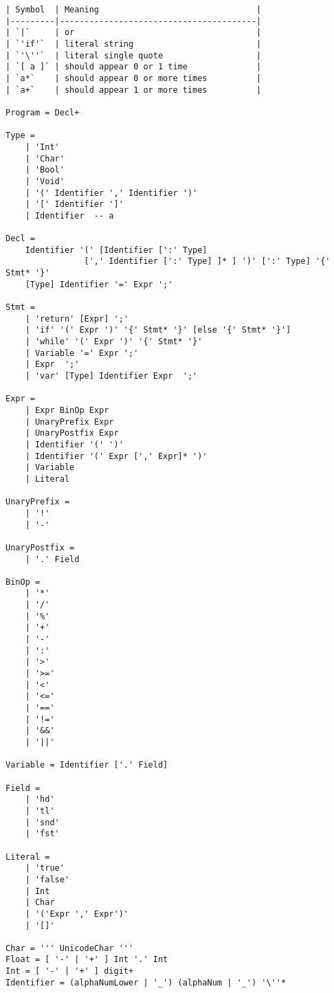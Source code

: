 \documentclass{report}
\begin{document}
\begin{verbatim}
| Symbol  | Meaning                                |
|---------|----------------------------------------|
| `|`     | or                                     |
| `'if'`  | literal string                         |
| `'\''`  | literal single quote                   |
| `[ a ]` | should appear 0 or 1 time              |
| `a*`    | should appear 0 or more times          |
| `a+`    | should appear 1 or more times          |

Program = Decl+

Type =
    | 'Int'             
    | 'Char'
    | 'Bool'
    | 'Void'
    | '(' Identifier ',' Identifier ')'
    | '[' Identifier ']'
    | Identifier  -- a

Decl =
    Identifier '(' [Identifier [':' Type]  
                [',' Identifier [':' Type] ]* ] ')' [':' Type] '{' Stmt* '}'
    [Type] Identifier '=' Expr ';'

Stmt =
    | 'return' [Expr] ';'
    | 'if' '(' Expr ')' '{' Stmt* '}' [else '{' Stmt* '}']
    | 'while' '(' Expr ')' '{' Stmt* '}'               
    | Variable '=' Expr ';'
    | Expr  ';'
    | 'var' [Type] Identifier Expr  ';'

Expr =
    | Expr BinOp Expr
    | UnaryPrefix Expr
    | UnaryPostfix Expr
    | Identifier '(' ')'
    | Identifier '(' Expr [',' Expr]* ')'
    | Variable              
    | Literal             

UnaryPrefix = 
    | '!'
    | '-'

UnaryPostfix =
    | '.' Field

BinOp =
    | '*'
    | '/'
    | '%'
    | '+'
    | '-'
    | ':'
    | '>'
    | '>='
    | '<'
    | '<='
    | '=='
    | '!='
    | '&&'
    | '||'

Variable = Identifier ['.' Field]

Field =
    | 'hd'
    | 'tl'
    | 'snd'
    | 'fst'

Literal =
    | 'true'
    | 'false'
    | Int            
    | Char          
    | '('Expr ',' Expr')' 
    | '[]' 

Char = ''' UnicodeChar '''
Float = [ '-' | '+' ] Int '.' Int
Int = [ '-' | '+' ] digit+
Identifier = (alphaNumLower | '_') (alphaNum | '_') '\''*
\end{verbatim}
\end{document}
